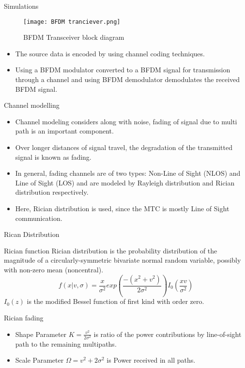 \documentclass{beamer}
\begin{document}
\begin{frame}{Simulations}
\begin{figure}[ht]
    \texttt{[image: BFDM tranciever.png]}
    \label{BFDM Reciver}
    \caption{BFDM Transceiver block diagram}
    \end{figure}
\begin{itemize}
    \item The source data is encoded by using channel coding techniques.
    \item  Using a BFDM modulator converted to a BFDM signal for transmission through a channel and using BFDM demodulator demodulates the received BFDM signal.
\end{itemize}
\end{frame}
\begin{frame}{Channel modelling}
\begin{itemize}
    \item Channel modeling considers along with noise, fading of signal due to multi path is an important component.
    \item Over longer distances of signal travel, the degradation of the transmitted signal is known as fading.
    \item In general, fading channels are of two types: Non-Line of Sight (NLOS) and Line of Sight (LOS) and are modeled by Rayleigh distribution and Rician distribution respectively.
    \item Here, Rician distribution is used, since the MTC is mostly Line of Sight communication.
\end{itemize}
\end{frame}
\begin{frame}{Rican Distribution}
    \begin{block}{Rician function}
          Rician distribution is the probability distribution of the magnitude of a circularly-symmetric bivariate normal random variable, possibly with non-zero mean (noncentral).\\
        \begin{equation*}
            f(x|v,\sigma)=\frac{x}{\sigma^2}exp\left(\frac{-(x^2+v^2)}{2\sigma^2}\right)I_0\left(\frac{xv}{\sigma^2}\right)
        \end{equation*}
        $I_0(z)$ is the modified Bessel function of first kind with order zero. 
    \end{block}
    \begin{block}{Rician fading}
    \begin{itemize}
        \item Shape Parameter $K=\frac{v^2}{2\sigma^2}$ is ratio of the power contributions by line-of-sight path to the remaining multipaths.
        \item Scale Parameter $\Omega=v^2+2\sigma^2$ is Power received in all paths.
    \end{itemize}
    \end{block}
\end{frame}
\end{document}
